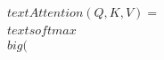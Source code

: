 \documentclass[preview]{standalone}
\begin{document}
\begin{align*}
\quad\\text{Attention}(Q, K, V) = \quad\\text{softmax}\quad\\big(
\end{align*}
\end{document}
